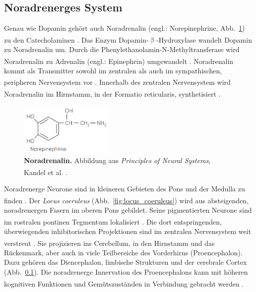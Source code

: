 \subsection{Noradrenerges System}
\label{noradrenerges_system}
Genau wie Dopamin gehört auch Noradrenalin (engl.: Norepinephrine, Abb.~\ref{fig:noradrenalin}) zu den Catecholaminen \textsuperscript{\cite[Kap.~1]{trepel2011neuroanatomie}}. Das Enzym Dopamin-$\upbeta$-Hydroxylase wandelt Dopamin zu Noradrenalin um. Durch die Phenylethanolamin-N-Methyltransferase wird Noradrenalin zu Adrenalin (engl.: Epinephrin) umgewandelt \textsuperscript{\cite[Kap.~13]{kandel2013principles}}. Noradrenalin kommt als Transmitter sowohl im zentralen als auch im sympathischen, peripheren Nervensystem vor \textsuperscript{\cite[Kap.~4]{crossman2014neuroanatomy}}. Innerhalb des zentralen Nervensystem wird Noradrenalin im Hirnstamm, in der Formatio reticularis, synthetisiert \textsuperscript{\cite[Kap.~7]{trepel2011neuroanatomie}}.

\begin{figure}[H]
    \centering
    \includegraphics[width=0.4\textwidth]{pictures/Bilder_monoamine_systeme/noradrenalin.PNG}
    \caption[Noradrenalin]{\textbf{Noradrenalin.} Abbildung aus \textit{Principles of Neural Systems}, Kandel et al. \textsuperscript{\cite[Kap.~13]{kandel2013principles}}.}
    \label{fig:noradrenalin}
\end{figure}

Noradrenerge Neurone sind in kleineren Gebieten des Pons und der Medulla zu finden \textsuperscript{\cite[Kap.~24]{kandel2013principles}}. Der \textit{Locus coeruleus} (Abb.~\ref{fig:locus_coeruleus}) wird aus absteigenden, noradrenergen Fasern im oberen Pons gebildet. Seine pigmentierten Neurone sind im rostralen pontinen Tegmentum lokalisiert \textsuperscript{\cite[Kap.~8]{crossman2014neuroanatomy}}. Die dort entspringenden, überwiegenden inhibitorischen Projektionen sind im zentralen Nervensystem weit verstreut \textsuperscript{\cite[Kap.~6]{trepel2011neuroanatomie}}. Sie projizieren ins Cerebellum, in den Hirnstamm und das Rückenmark, aber auch in viele Teilbereiche des Vorderhirns (Proencephalon). Dazu gehören das Diencephalon, limbische Strukturen und der cerebrale Cortex (Abb.~\ref{noradrenerges_system}). Die noradrenerge Innervation des Proencephalons kann mit höheren kognitiven Funktionen und Gemütszuständen in Verbindung gebracht werden \textsuperscript{\cite[Kap.~8]{crossman2014neuroanatomy}}.

